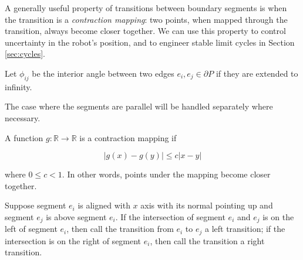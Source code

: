 \documentclass[]{styles/svproc}  %
\begin{document}
A generally useful property of transitions between boundary segments is when the
transition is a \emph{contraction mapping}: two points, when mapped through the
transition, always become closer together. We can use this property to control
uncertainty in the robot's position, and to engineer stable limit cycles in
Section \ref{sec:cycles}.

\begin{definition}
Let $\phi_{ij}$ be the interior angle between two edges $e_i, e_j \in \partial P$ if
they are extended to infinity. 
\end{definition}

The case where the segments are parallel will be
handled separately where necessary. 

\begin{definition}

A function $g: \mathbb{R} \to \mathbb{R}$ is a contraction mapping if

\begin{equation*}
|g(x) - g(y)| \leq c |x-y|
\end{equation*}

where $0 \leq c < 1$. In other words, points under the mapping become closer
together.
\end{definition}

\begin{definition}
Suppose segment $e_i$ is aligned with $x$ axis with its normal pointing up and
segment $e_j$ is above segment $e_i$. If the intersection of segment $e_i$ and
$e_j$ is
on the left of segment $e_i$, then call the transition from $e_i$ to $e_j$ a left
transition; if the intersection is on the right of segment $e_i$, then call the
transition a right transition.
\end{definition}
\end{document}
